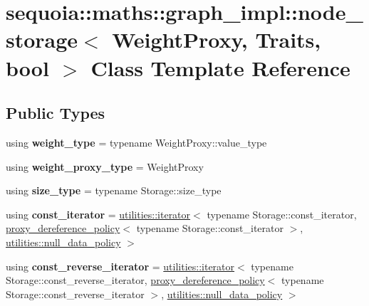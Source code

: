 \hypertarget{classsequoia_1_1maths_1_1graph__impl_1_1node__storage}{}\section{sequoia\+::maths\+::graph\+\_\+impl\+::node\+\_\+storage$<$ Weight\+Proxy, Traits, bool $>$ Class Template Reference}
\label{classsequoia_1_1maths_1_1graph__impl_1_1node__storage}
\subsection*{Public Types}
\begin{DoxyCompactItemize}
\item 
\mbox{\label{classsequoia_1_1maths_1_1graph__impl_1_1node__storage_a9d046f394d0f4e7706a71ba0cd39a59e}} 
using {\bfseries weight\+\_\+type} = typename Weight\+Proxy\+::value\+\_\+type
\item 
\mbox{\label{classsequoia_1_1maths_1_1graph__impl_1_1node__storage_ac6e09c7ff1f01bbc114ace760e2a2994}} 
using {\bfseries weight\+\_\+proxy\+\_\+type} = Weight\+Proxy
\item 
\mbox{\label{classsequoia_1_1maths_1_1graph__impl_1_1node__storage_a435aefa6ee296377c859bb74257daead}} 
using {\bfseries size\+\_\+type} = typename Storage\+::size\+\_\+type
\item 
\mbox{\label{classsequoia_1_1maths_1_1graph__impl_1_1node__storage_a7e0d10d40579595e9f4240ccc3fdc06a}} 
using {\bfseries const\+\_\+iterator} = \mbox{\hyperlink{classsequoia_1_1utilities_1_1iterator}{utilities\+::iterator}}$<$ typename Storage\+::const\+\_\+iterator, \mbox{\hyperlink{structsequoia_1_1maths_1_1graph__impl_1_1proxy__dereference__policy}{proxy\+\_\+dereference\+\_\+policy}}$<$ typename Storage\+::const\+\_\+iterator $>$, \mbox{\hyperlink{structsequoia_1_1utilities_1_1null__data__policy}{utilities\+::null\+\_\+data\+\_\+policy}} $>$
\item 
\mbox{\label{classsequoia_1_1maths_1_1graph__impl_1_1node__storage_ade12ce772f67a741727e3e1394f6a8cb}} 
using {\bfseries const\+\_\+reverse\+\_\+iterator} = \mbox{\hyperlink{classsequoia_1_1utilities_1_1iterator}{utilities\+::iterator}}$<$ typename Storage\+::const\+\_\+reverse\+\_\+iterator, \mbox{\hyperlink{structsequoia_1_1maths_1_1graph__impl_1_1proxy__dereference__policy}{proxy\+\_\+dereference\+\_\+policy}}$<$ typename Storage\+::const\+\_\+reverse\+\_\+iterator $>$, \mbox{\hyperlink{structsequoia_1_1utilities_1_1null__data__policy}{utilities\+::null\+\_\+data\+\_\+policy}} $>$
\end{DoxyCompactItemize}
